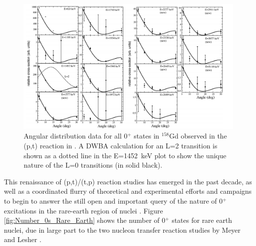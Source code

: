 \begin{figure}[ht]
\begin{center}
\includegraphics[width=\textwidth]{158Gd(pt).png}
\caption{Angular distribution data for all 0$^+$ states in $^{158}$Gd observed in the (p,t) reaction in \cite{Meyer_pt0_2006}. A DWBA calculation for an L=2 transition is shown as a dotted line in the E=1452~keV plot to show the unique nature of the L=0 transitions (in solid black).}
\label{fig:158Gdpt}
\end{center}
\end{figure}

This renaissance of (p,t)/(t,p) reaction studies has emerged in the past decade, as well as a coordinated flurry of theoretical and experimental efforts and campaigns to begin to answer the still open and important query of the nature of 0$^+$ excitations in the rare-earth region of nuclei \cite{WuAprahamian_multiphonon_1994, Aprahamian2004, Borner_collective1999, Garrett_betavib2001,RevModPhys.83.1467, Bonatsos_collective02009, Clark_pairtransfer2009, Pietrella_beta_2004, Zamfir_doubleoctupole_2002, Sun_0plusnature_PSM_2003}. Figure \ref{fig:Number_0s_Rare_Earth} shows the number of 0$^+$ states for rare earth nuclei, due in large part to the two nucleon transfer reaction studies by Meyer and Lesher \cite{Lesher_158Gdpt,Meyer_pt0_2006}.

